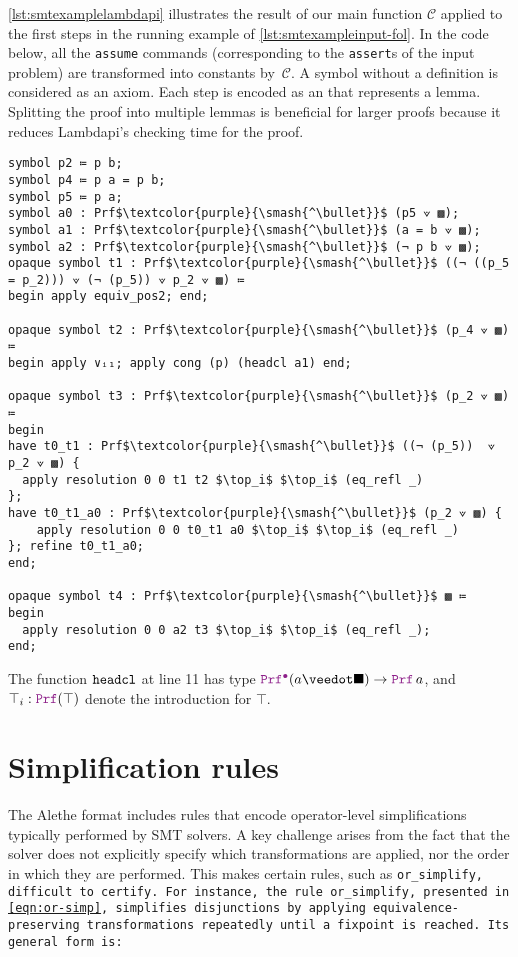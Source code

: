 \begin{example}
\cref{lst:smtexamplelambdapi} illustrates the result of our main function $\mathcal{C}$ applied to the first steps in the running example of \cref{lst:smtexampleinput-fol}.
In the code below, all the \texttt{assume} commands (corresponding to the \texttt{assert}s of the input problem) are transformed into constants by~$\mathcal{C}$. A symbol without a definition is considered as an axiom.
Each step is encoded as an  that represents a lemma. Splitting the proof into multiple lemmas is beneficial for larger proofs because it reduces Lambdapi's checking time for the proof.

\begin{lstlisting}[mathescape=true, caption={Trace from  encoded in Lambdapi.}, label={lst:smtexamplelambdapi}, language=Lambdapi]
symbol p2 ≔ p b;
symbol p4 ≔ p a = p b;
symbol p5 ≔ p a;
symbol a0 : Prf$\textcolor{purple}{\smash{^\bullet}}$ (p5 ⟇ ▩);
symbol a1 : Prf$\textcolor{purple}{\smash{^\bullet}}$ (a = b ⟇ ▩);
symbol a2 : Prf$\textcolor{purple}{\smash{^\bullet}}$ (¬ p b ⟇ ▩);
opaque symbol t1 : Prf$\textcolor{purple}{\smash{^\bullet}}$ ((¬ ((p_5 = p_2))) ⟇ (¬ (p_5)) ⟇ p_2 ⟇ ▩) ≔
begin apply equiv_pos2; end;

opaque symbol t2 : Prf$\textcolor{purple}{\smash{^\bullet}}$ (p_4 ⟇ ▩) ≔
begin apply ∨ᵢ₁; apply cong (p) (headcl a1) end;

opaque symbol t3 : Prf$\textcolor{purple}{\smash{^\bullet}}$ (p_2 ⟇ ▩) ≔
begin
have t0_t1 : Prf$\textcolor{purple}{\smash{^\bullet}}$ ((¬ (p_5))  ⟇ p_2 ⟇ ▩) {
  apply resolution 0 0 t1 t2 $\top_i$ $\top_i$ (eq_refl _)
};
have t0_t1_a0 : Prf$\textcolor{purple}{\smash{^\bullet}}$ (p_2 ⟇ ▩) {
    apply resolution 0 0 t0_t1 a0 $\top_i$ $\top_i$ (eq_refl _)
}; refine t0_t1_a0;
end;

opaque symbol t4 : Prf$\textcolor{purple}{\smash{^\bullet}}$ ▩ ≔
begin
  apply resolution 0 0 a2 t3 $\top_i$ $\top_i$ (eq_refl _);
end;
\end{lstlisting}
The function $\texttt{\upshape{headcl}}$ at line 11 has type $\prfcl (a \veedot \nil) \ra \prf\,a$, and $\top_i: \prf (\top)$ denote the introduction for $\top$.
\end{example}

\section{Simplification rules}

The Alethe format includes rules that encode operator-level simplifications typically performed by SMT solvers.
A key challenge arises from the fact that the solver does not explicitly specify which transformations are applied, nor the order in which they are performed. This makes certain rules, such as \tt{or\_simplify}, difficult to certify.
For instance, the rule \texttt{or\_simplify}, presented in \cref{eqn:or-simp}, simplifies disjunctions by applying equivalence-preserving transformations repeatedly until a fixpoint is reached. Its general form is:

